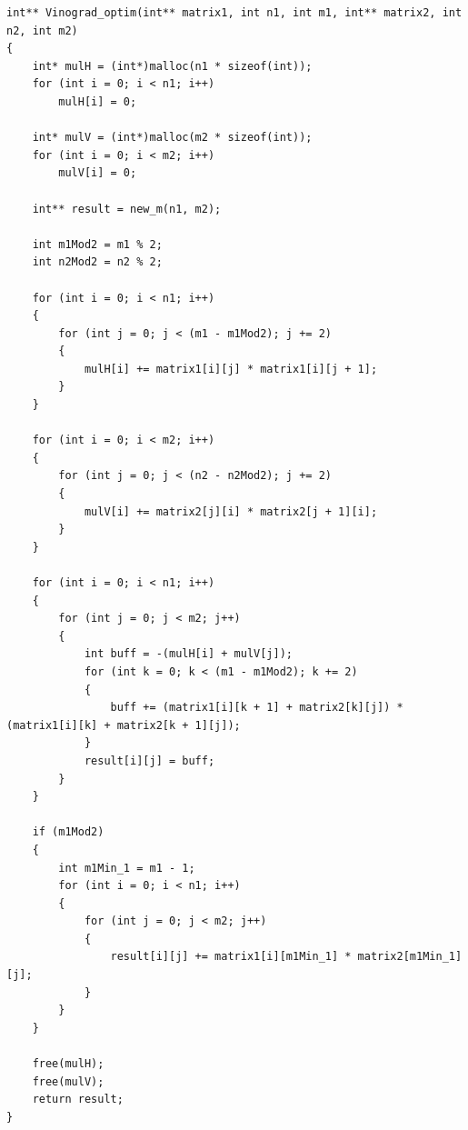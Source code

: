 \documentclass[12pt]{report}
\begin{document}
\begin{lstlisting}[label=some-code,caption=Оптимизированный алгоритм Винограда]
int** Vinograd_optim(int** matrix1, int n1, int m1, int** matrix2, int n2, int m2)
{
	int* mulH = (int*)malloc(n1 * sizeof(int));
	for (int i = 0; i < n1; i++)
		mulH[i] = 0;

	int* mulV = (int*)malloc(m2 * sizeof(int));
	for (int i = 0; i < m2; i++)
		mulV[i] = 0;

	int** result = new_m(n1, m2);

	int m1Mod2 = m1 % 2;
	int n2Mod2 = n2 % 2;

	for (int i = 0; i < n1; i++)
	{
		for (int j = 0; j < (m1 - m1Mod2); j += 2)
		{
			mulH[i] += matrix1[i][j] * matrix1[i][j + 1];
		}
	}

	for (int i = 0; i < m2; i++)
	{
		for (int j = 0; j < (n2 - n2Mod2); j += 2)
		{
			mulV[i] += matrix2[j][i] * matrix2[j + 1][i];
		}
	}

	for (int i = 0; i < n1; i++)
	{
		for (int j = 0; j < m2; j++)
		{
			int buff = -(mulH[i] + mulV[j]);
			for (int k = 0; k < (m1 - m1Mod2); k += 2)
			{
				buff += (matrix1[i][k + 1] + matrix2[k][j]) * (matrix1[i][k] + matrix2[k + 1][j]);
			}
			result[i][j] = buff;
		}
	}

	if (m1Mod2)
	{
		int m1Min_1 = m1 - 1;
		for (int i = 0; i < n1; i++)
		{
			for (int j = 0; j < m2; j++)
			{
				result[i][j] += matrix1[i][m1Min_1]	* matrix2[m1Min_1][j];
			}
		}
	}

	free(mulH);
	free(mulV);
	return result;
}
\end{lstlisting}
\end{document}
